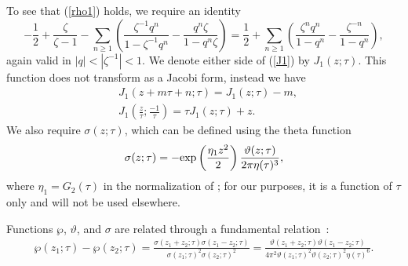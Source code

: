 \documentclass[pdftex]{sigma}
\numberwithin{equation}{section}
\theoremstyle{definition}
\begin{document}
To see that (\ref{rho1}) holds, we require an identity
\begin{equation} \label{J1}
-\frac12 +\frac{\zeta}{\zeta-1} - \sum_{n \geq 1}\left(\frac{ \zeta^{-1} q^n}{1- \zeta^{-1}q^n}-\frac{q^n \zeta}{1-q^n \zeta}\right)=\frac12+\sum_{n \geq 1} \left(\frac{\zeta^n q^n}{1-q^n}-\frac{\zeta^{-n}}{1-q^n} \right),
\end{equation}
again valid in $|q|<|\zeta^{-1}|<1$. We denote either side of (\ref{J1}) by $J_1(z;\tau)$.
This function does not transform as a Jacobi form, instead we have
\begin{align*}%
&J_1(z+ m \tau+n;\tau)= J_1(z;\tau)-m, \\
&J_1 \left(\frac{z}{\tau};\frac{-1}{\tau}\right)=\tau J_1(z;\tau)+z.
\end{align*}
We also require $\sigma(z;\tau)$, which can be defined using the theta function \cite{Lang}
\[
\sigma(z;\tau)=-{\rm exp}\left(\frac{\eta_1 z^2}{2}\right)\frac{\vartheta(z;\tau)}{2 \pi \eta(\tau)^3},
\]
where $\eta_1=G_2(\tau)$ in the normalization of \cite{Lang}; for our purposes, it is a function of $\tau$ only and will not be used elsewhere.

Functions $\wp$, $\vartheta$, and $\sigma$ are related through a fundamental relation~\cite{Lang}:
\begin{align}
\wp(z_1;\tau)-\wp(z_2;\tau)=\frac{\sigma(z_1+z_2;\tau)\sigma(z_1-z_2;\tau)}{\sigma(z_1;\tau)^2\sigma(z_2;\tau)^2} =\frac{\vartheta(z_1+z_2;\tau) \vartheta(z_1-z_2;\tau)}{ 4 \pi^2 \vartheta(z_1;\tau)^2 \vartheta(z_2;\tau)^2 \eta(\tau)^6}.\label{rho-sigma}
\end{align}
\end{document}
